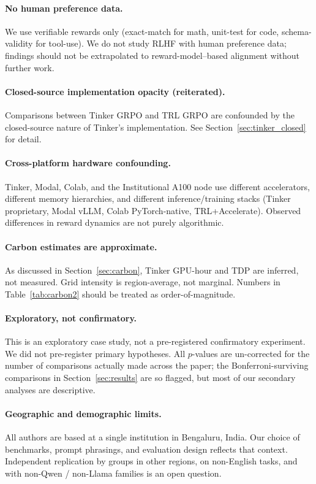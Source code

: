\paragraph{No human preference data.}
We use verifiable rewards only (exact-match for math, unit-test for code,
schema-validity for tool-use). We do not study RLHF with human preference
data; findings should not be extrapolated to reward-model--based alignment
without further work.

\paragraph{Closed-source implementation opacity (reiterated).}
Comparisons between Tinker GRPO and TRL GRPO are confounded by the
closed-source nature of Tinker's implementation. See
Section~\ref{sec:tinker_closed} for detail.

\paragraph{Cross-platform hardware confounding.}
Tinker, Modal, Colab, and the Institutional A100 node use different accelerators,
different memory hierarchies, and different inference/training stacks
(Tinker proprietary, Modal vLLM, Colab PyTorch-native, TRL+Accelerate).
Observed differences in reward dynamics are not purely algorithmic.

\paragraph{Carbon estimates are approximate.}
As discussed in Section~\ref{sec:carbon}, Tinker GPU-hour and TDP are
inferred, not measured. Grid intensity is region-average, not marginal.
Numbers in Table~\ref{tab:carbon2} should be treated as
order-of-magnitude.

\paragraph{Exploratory, not confirmatory.}
This is an exploratory case study, not a pre-registered confirmatory
experiment. We did not pre-register primary hypotheses. All $p$-values are
un-corrected for the number of comparisons actually made across the
paper; the Bonferroni-surviving comparisons in
Section~\ref{sec:results} are so flagged, but most of our secondary
analyses are descriptive.

\paragraph{Geographic and demographic limits.}
All authors are based at a single institution in Bengaluru, India. Our
choice of benchmarks, prompt phrasings, and evaluation design reflects
that context. Independent replication by groups in other regions, on
non-English tasks, and with non-Qwen / non-Llama families is an open
question.

